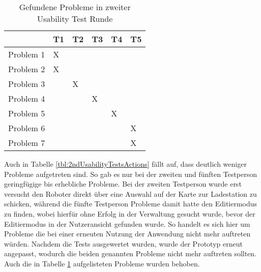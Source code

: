 \begin{table}[H]
    \caption{Gefundene Probleme in zweiter Usability Test Runde}\label{tbl:2ndUsabilityTestsProblems}
    \begin{tabular}{l|l|l|l|l|l}
                    & T1    & T2    & T3    & T4    & T5    \\ \hline
        Problem 1   & X     &       &       &       &       \\
        Problem 2   & X     &       &       &       &       \\
        Problem 3   &       & X     &       &       &       \\
        Problem 4   &       &       & X     &       &       \\
        Problem 5   &       &       &       & X     &       \\
        Problem 6   &       &       &       &       & X     \\
        Problem 7   &       &       &       &       & X     \\
    \end{tabular}    
\end{table}

Auch in Tabelle \ref{tbl:2ndUsabilityTestsActions} fällt auf, dass deutlich weniger Probleme aufgetreten sind. So gab es nur bei der zweiten und fünften Testperson geringfügige bis erhebliche Probleme. Bei der zweiten Testperson wurde erst versucht den Roboter direkt über eine Auswahl auf der Karte zur Ladestation zu schicken, während die fünfte Testperson Probleme damit hatte den Editiermodus zu finden, wobei hierfür ohne Erfolg in der Verwaltung gesucht wurde, bevor der Editiermodus in der Nutzeransicht gefunden wurde. So handelt es sich hier um Probleme die bei einer erneuten Nutzung der Anwendung nicht mehr auftreten würden. Nachdem die Tests ausgewertet wurden, wurde der Prototyp erneut angepasst, wodurch die beiden genannten Probleme nicht mehr auftreten sollten. Auch die in Tabelle \ref{tbl:2ndUsabilityTestsProblems} aufgelisteten Probleme wurden behoben.

